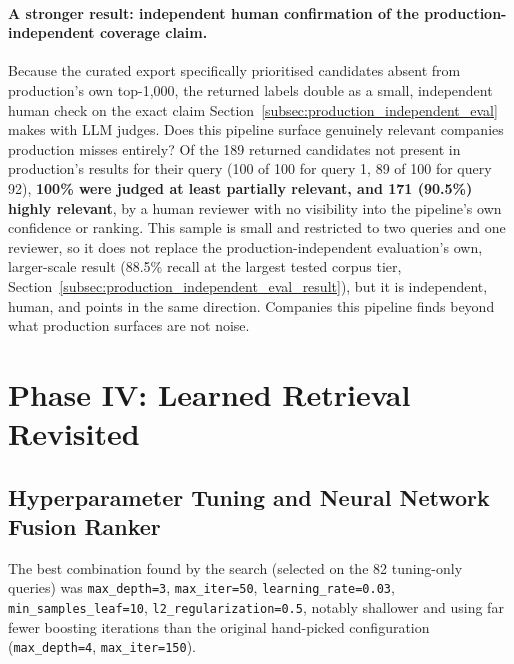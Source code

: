 \documentclass[a4paper,oneside,bibliography=totoc]{scrbook}
\begin{document}
\paragraph{A stronger result: independent human confirmation of the production-independent coverage claim.} Because the curated export specifically prioritised candidates absent from production's own top-1{,}000, the returned labels double as a small, independent human check on the exact claim Section~\ref{subsec:production_independent_eval} makes with LLM judges. Does this pipeline surface genuinely relevant companies production misses entirely? Of the 189 returned candidates not present in production's results for their query (100 of 100 for query 1, 89 of 100 for query 92), \textbf{100\% were judged at least partially relevant, and 171 (90.5\%) highly relevant}, by a human reviewer with no visibility into the pipeline's own confidence or ranking. This sample is small and restricted to two queries and one reviewer, so it does not replace the production-independent evaluation's own, larger-scale result (88.5\% recall at the largest tested corpus tier, Section~\ref{subsec:production_independent_eval_result}), but it is independent, human, and points in the same direction. Companies this pipeline finds beyond what production surfaces are not noise.

\section{Phase IV: Learned Retrieval Revisited}
\label{sec:phase4_result}

\subsection{Hyperparameter Tuning and Neural Network Fusion Ranker}
\label{subsec:hyperparameter_tuning_result}

The best combination found by the search (selected on the 82 tuning-only queries) was \texttt{max\_depth=3}, \texttt{max\_iter=50}, \texttt{learning\_rate=0.03}, \texttt{min\_samples\_leaf=10}, \texttt{l2\_regularization=0.5}, notably shallower and using far fewer boosting iterations than the original hand-picked configuration (\texttt{max\_depth=4}, \texttt{max\_iter=150}).
\end{document}
